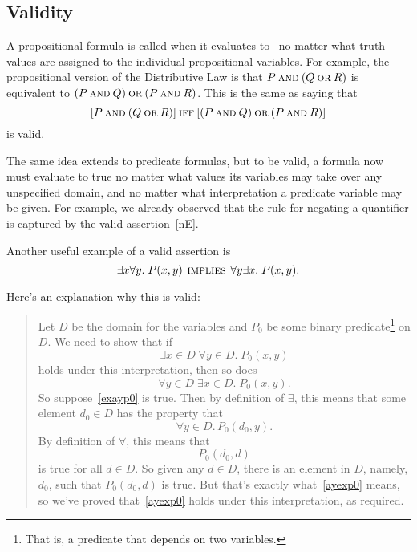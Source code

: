 \iffalse Logicians have worked very hard to define strict rules for the
use of logic notation so that ideas can be expressed with absolute rigor.
It's all quite charming and clever.  However, the sad irony is that
applied mathematicans usually use their beloved notation as a crude
shorthand, breaking the rules and abusing the notation willy-nilly ---sort
of like pounding nails with fine china.  \fi

\subsection{Validity}

A propositional formula is called  when it evaluates to \true\
no matter what truth values are assigned to the individual propositional
variables.  For example, the propositional version of the Distributive Law
is that $P \mathbin{\mathrm{\textsc{and}}} (Q \mathbin{\mathrm{\textsc{or}}} R)$ is equivalent to $(P \mathbin{\mathrm{\textsc{and}}} Q) \mathbin{\mathrm{\textsc{or}}} (P \mathbin{\mathrm{\textsc{and}}}
R)$.  This is the same as saying that
\[
[P \mathbin{\mathrm{\textsc{and}}} (Q \mathbin{\mathrm{\textsc{or}}} R)] \mathbin{\mathrm{\textsc{iff}}} [(P \mathbin{\mathrm{\textsc{and}}} Q) \mathbin{\mathrm{\textsc{or}}} (P \mathbin{\mathrm{\textsc{and}}} R)]
\]
is valid.

The same idea extends to predicate formulas, but to be valid, a
formula now must evaluate to true no matter what values its variables
may take over any unspecified domain, and no matter what
interpretation a predicate variable may be given.  For example, we
already observed that the rule for negating a quantifier is captured
by the valid assertion~\eqref{nE}.

Another useful example of a valid assertion is
\begin{equation}\label{eaimpliesae}
\exists x \forall y.\; P(x,y) \mathbin{\mathrm{\textsc{\,implies\,}}} \forall y \exists x.\; P(x,y).
\end{equation}

Here's an explanation why this is valid:

\begin{quote}
Let $D$ be the domain for the variables and $P_0$ be some
binary predicate\footnote{That is, a predicate that depends on two variables.}
on $D$.  We need to show that if
\begin{equation}\label{exayp0}
\exists x \in D\; \forall y \in D.\; P_0(x,y)
\end{equation}
holds under this interpretation, then so does
\begin{equation}\label{ayexp0}
\forall y \in D\; \exists x \in D.\; P_0(x,y).
\end{equation}
So suppose~\eqref{exayp0} is true.  Then by definition of $\exists$, this
means that some element $d_0 \in D$ has the property that
\[
\forall y \in D.\, P_0(d_0, y).
\]
By definition of $\forall$, this means that
\[
P_0(d_0,d)
\]
is true for all $d \in D$.  So given any $d \in D$, there is an element in
$D$, namely, $d_0$, such that $P_0(d_0,d)$ is true.  But that's exactly
what~\eqref{ayexp0} means, so we've proved that~\eqref{ayexp0} holds under
this interpretation, as required.
\end{quote}

